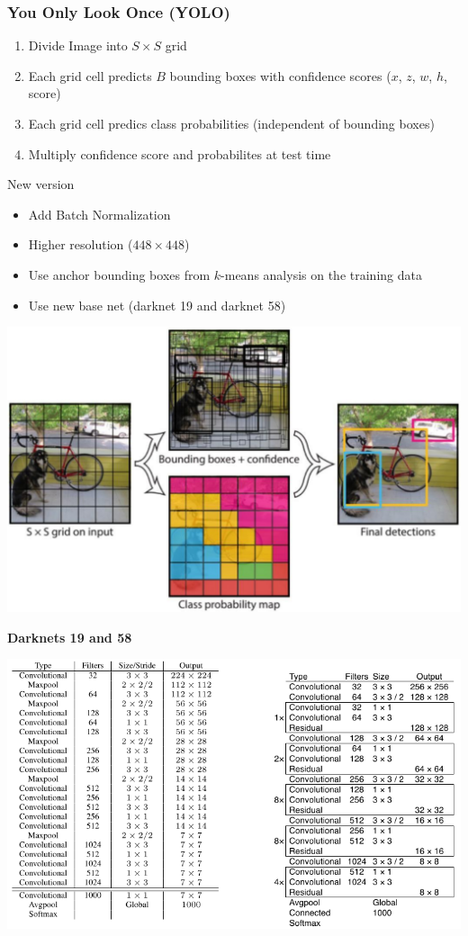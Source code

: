 \subsubsection{You Only Look Once (YOLO)}
\begin{minipage}{0.5\textwidth}
    \begin{enumerate}
        \item Divide Image into $S\times S$ grid
        \item Each grid cell predicts $B$ bounding boxes with confidence scores ($x$, $z$, $w$, $h$, score)
        \item Each grid cell predics class probabilities (independent of bounding boxes)
        \item Multiply confidence score and probabilites at test time
    \end{enumerate}
    New version
    \begin{itemize}
        \item Add Batch Normalization
        \item Higher resolution ($448\times 448$)
        \item Use anchor bounding boxes from $k$-means analysis on the training data
        \item Use new base net (darknet 19 and darknet 58)
    \end{itemize}
\end{minipage}
\begin{minipage}{0.5\textwidth}
    \includegraphics[width=1\textwidth]{sections/FindingMultipleObjects/img/yolo.png}
\end{minipage}
\clearpage
\textbf{Darknets 19 and 58}

\includegraphics[width=.9\textwidth]{sections/FindingMultipleObjects/img/darknets.png}

